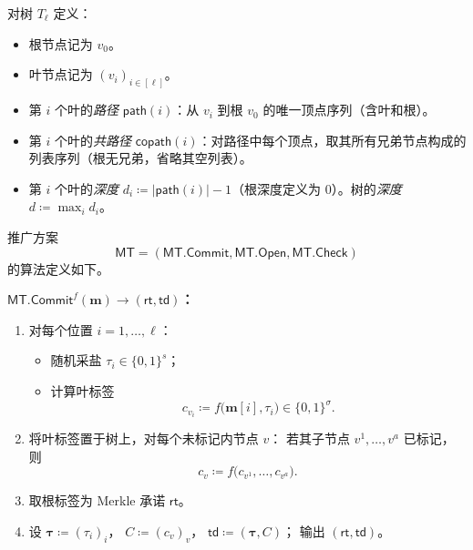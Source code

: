 \documentclass[american,singlepageview]{snargs-book-zh}
\newcommand{\Bits}{\{0,1\}}
\newcommand{\DefineEqual}{\coloneqq}
\renewcommand{\vec}[1]{\bm{#1}}
\newcommand{\ProtoSalt}{\tau}
\newcommand{\ROFunction}{f}
\newcommand{\ROOutputSize}{\sigma}
\newcommand{\CMMessageLength}{\ell}
\newcommand{\MTGraph}{T}
\newcommand{\MTGraphVertex}{v}
\newcommand{\MTGraphLeaf}{v}
\newcommand{\MTDepth}{d}
\newcommand{\MTPath}{\mathsf{path}}
\newcommand{\MTCoPath}{\mathsf{copath}}
\newcommand{\MTSymbol}{\mathsf{MT}}
\newcommand{\MTCommit}{\MTSymbol.\mathsf{Commit}}
\newcommand{\MTOpen}{\MTSymbol.\mathsf{Open}}
\newcommand{\MTCheck}{\MTSymbol.\mathsf{Check}}
\newcommand{\MTMessageLength}{\CMMessageLength}
\newcommand{\MTSaltSize}{s}
\newcommand{\MTVertexLabels}{C}
\newcommand{\MTVertexLabel}{c}
\newcommand{\MTCommitment}{\mathsf{rt}}
\newcommand{\MTTrapdoor}{\mathsf{td}}
\newcommand{\MTMessageIndex}{i}
\newcommand{\MTMessageEntry}{m}
\newcommand{\MTMessageVector}{\mathbf{\MTMessageEntry}}
\newcommand{\MTSaltString}{\ProtoSalt}
\newcommand{\MTSaltStrings}{\vec{\ProtoSalt}}
\newcommand{\MTArity}{a}
\begin{document}
\begin{definition}
\label{definition:notation-for-arbitrary-tree}
对树 $\MTGraph_{\MTMessageLength}$ 定义：
\begin{itemize}[nolistsep]
  \item 根节点记为 $\MTGraphVertex_{0}$。
  \item 叶节点记为 $(\MTGraphLeaf_{\MTMessageIndex})_{\MTMessageIndex\in[\MTMessageLength]}$。
  \item 第 $\MTMessageIndex$ 个叶的\emph{路径} $\MTPath(\MTMessageIndex)$：从 $\MTGraphLeaf_{\MTMessageIndex}$ 到根 $\MTGraphVertex_{0}$ 的唯一顶点序列（含叶和根）。
  \item 第 $\MTMessageIndex$ 个叶的\emph{共路径} $\MTCoPath(\MTMessageIndex)$：对路径中每个顶点，取其所有兄弟节点构成的列表序列（根无兄弟，省略其空列表）。
  \item 第 $\MTMessageIndex$ 个叶的\emph{深度} $\MTDepth_{\MTMessageIndex}\DefineEqual|\MTPath(\MTMessageIndex)|-1$（根深度定义为 $0$）。树的\emph{深度} $\MTDepth\DefineEqual\max_{\MTMessageIndex} \MTDepth_{\MTMessageIndex}$。
\end{itemize}
\end{definition}

推广方案
\[
\MTSymbol=(\MTCommit,\MTOpen,\MTCheck)
\]
的算法定义如下。

\medskip
\noindent\textbf{$\MTCommit^{\ROFunction}(\MTMessageVector)\to(\MTCommitment,\MTTrapdoor)$：}
\begin{enumerate}[nolistsep]
  \item 对每个位置 $\MTMessageIndex=1,\dots,\MTMessageLength$：
    \begin{itemize}[nolistsep]
      \item 随机采盐 $\MTSaltString_{\MTMessageIndex}\in\Bits^{\MTSaltSize}$；
      \item 计算叶标签
      \[
      \MTVertexLabel_{\MTGraphLeaf_{\MTMessageIndex}}
      \DefineEqual
      \ROFunction\bigl(\MTMessageVector[\MTMessageIndex],\MTSaltString_{\MTMessageIndex}\bigr)\in\Bits^{\ROOutputSize}.
      \]
    \end{itemize}
  \item 将叶标签置于树上，对每个未标记内节点 $\MTGraphVertex$：
    若其子节点 $\MTGraphVertex^1,\dots,\MTGraphVertex^\MTArity$ 已标记，则
    \[
    \MTVertexLabel_{\MTGraphVertex}
    \DefineEqual
    \ROFunction\bigl(\MTVertexLabel_{\MTGraphVertex^1},\dots,\MTVertexLabel_{\MTGraphVertex^\MTArity}\bigr).
    \]
  \item 取根标签为 Merkle 承诺 $\MTCommitment$。
  \item 设 $\MTSaltStrings\DefineEqual(\MTSaltString_{\MTMessageIndex})_{\MTMessageIndex}$，
        $\MTVertexLabels\DefineEqual(\MTVertexLabel_{\MTGraphVertex})_{\MTGraphVertex}$，
        $\MTTrapdoor\DefineEqual(\MTSaltStrings,\MTVertexLabels)$；
        输出 $(\MTCommitment,\MTTrapdoor)$。
\end{enumerate}
\end{document}
